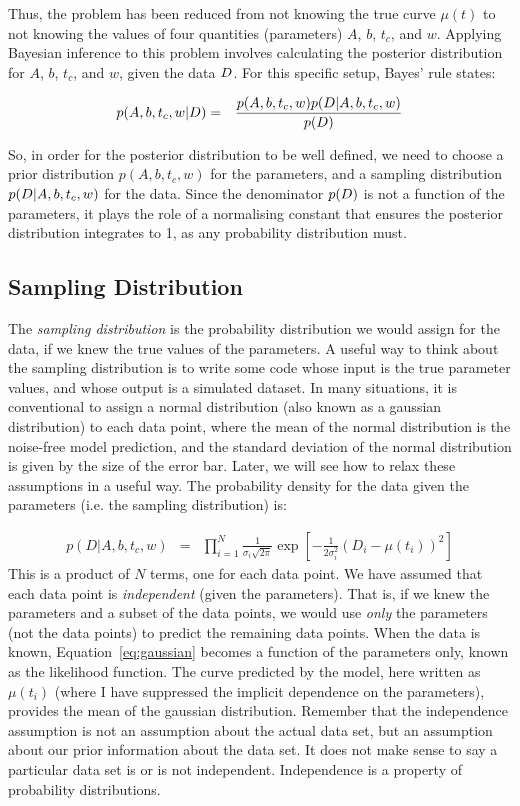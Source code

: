 Thus, the problem has been reduced from not knowing the true curve $\mu(t)$
to not knowing the values of four quantities (parameters)
$A$, $b$, $t_c$, and $w$. Applying Bayesian inference to this problem
involves calculating the posterior distribution for $A$, $b$, $t_c$, and $w$,
given the data $D$. For this specific setup, Bayes' rule states:

\begin{eqnarray}
p(A, b, t_c, w | D) &=& \frac{p(A, b, t_c, w)p(D | A, b, t_c, w)}
{p(D)}
\end{eqnarray}

So, in order for the posterior distribution to be well defined, we need to
choose a prior distribution $p(A, b, t_c, w)$ for the parameters, and a
sampling distribution $p(D | A, b, t_c, w)$ for the data. Since the denominator
$p(D)$ is not a function of the parameters, it plays the role of a normalising
constant that ensures the posterior distribution integrates to 1, as any
probability distribution must.

\subsection{Sampling Distribution}
The {\it sampling distribution} is the probability distribution we would assign
for the data, if we knew the true values of the parameters. A useful way to
think about the sampling distribution is to write some code whose input is the
true parameter values, and whose output is a simulated dataset.
In many situations, it is conventional to assign a normal distribution
(also known as a gaussian distribution) to each data point, where the mean
of the normal distribution is the noise-free model prediction, and the
standard deviation of the normal distribution is given by the size of the
error bar. Later, we will see how to relax these assumptions in a useful way.
The probability density for the data given the parameters (i.e. the sampling
distribution) is:

\begin{eqnarray}
p(D | A, b, t_c, w) &=& \prod_{i=1}^N \frac{1}{\sigma_i \sqrt{2\pi}}
\exp\left[-\frac{1}{2\sigma_i^2}\left(D_i - \mu(t_i)\right)^2\right]\label{eq:gaussian}
\end{eqnarray}
This is a product of $N$ terms, one for each data point. We have assumed that
each data point is {\it independent} (given the parameters). That is, if we
knew the parameters and a subset of the data points, we would use {\it only} the parameters (not the data points) to predict the remaining data points.
When the data is known, Equation~\ref{eq:gaussian} becomes a
function of the parameters only, known as the likelihood function.
The curve predicted
by the model, here written as $\mu(t_i)$ (where I have suppressed the implicit
dependence on the parameters), provides the mean of the gaussian
distribution. Remember that the independence assumption is not an assumption
about the actual data set, but an assumption
about our prior information about the data set. It does not make sense to say
a particular data set is or is not independent. Independence is a property of
probability distributions.


